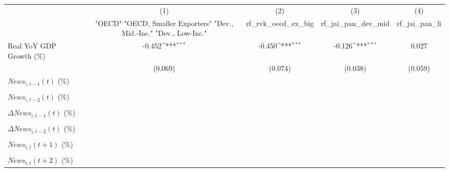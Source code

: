 {
\def\sym#1{\ifmmode^{#1}\else\(^{#1}\)\fi}
\begin{tabular}{l*{4}{c}}
\toprule
                    &\multicolumn{1}{c}{(1)}&\multicolumn{1}{c}{(2)}&\multicolumn{1}{c}{(3)}&\multicolumn{1}{c}{(4)}\\
                    &\multicolumn{1}{c}{ "OECD" "OECD, Smaller Exporters" "Dev., Mid.-Inc." "Dev., Low-Inc."}&\multicolumn{1}{c}{rf_rvk_oecd_ex_big}&\multicolumn{1}{c}{rf_jai_pan_dev_mid}&\multicolumn{1}{c}{rf_jai_pan_li}\\
\midrule
Real YoY GDP Growth (\%)&      -0.452\sym{***}&      -0.450\sym{***}&      -0.126\sym{***}&       0.027         \\
                    &     (0.069)         &     (0.074)         &     (0.038)         &     (0.059)         \\
\addlinespace
$ News_{i,t-1}(t)$ (\%)&                     &                     &                     &                     \\
                    &                     &                     &                     &                     \\
\addlinespace
$ News_{i,t-2}(t)$ (\%)&                     &                     &                     &                     \\
                    &                     &                     &                     &                     \\
\addlinespace
$ \Delta News_{i,t-1}(t)$ (\%)&                     &                     &                     &                     \\
                    &                     &                     &                     &                     \\
\addlinespace
$ \Delta News_{i,t-2}(t)$ (\%)&                     &                     &                     &                     \\
                    &                     &                     &                     &                     \\
\addlinespace
$ News_{i,t}(t+1)$ (\%)&                     &                     &                     &                     \\
                    &                     &                     &                     &                     \\
\addlinespace
$ News_{i,t}(t+2)$ (\%)&                     &                     &                     &                     \\

\end{tabular}}
